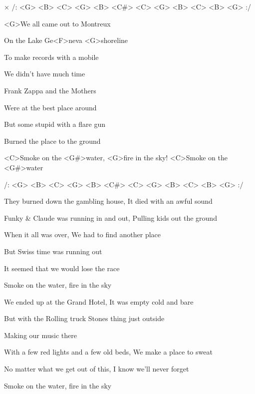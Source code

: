 

× /: <G> <B> <C> <G> <B> <C#> <C> <G> 
<B> <C> <B> <G> :/
\kr

\zs
<G>We all came out to Montreux

On the Lake Ge<F>neva <G>shoreline

To make records with a mobile

We didn't have much time

Frank Zappa and the Mothers

Were at the best place around

But some stupid with a flare gun

Burned the place to the ground
\ks

\zr
<C>Smoke on the <G#>water, <G>fire in the sky! <C>Smoke on the <G#>water

/: <G> <B> <C> <G> <B> <C#> <C> <G> <B> <C> <B> <G> :/
\kr

\zs
They burned down the gambling house,
It died with an awful sound

Funky \& Claude was running in and out,
Pulling kids out the ground

When it all was over,
We had to find another place

But Swiss time was running out

It seemed that we would lose the race

Smoke on the water, fire in the sky
\ks

\zs
We ended up at the Grand Hotel,
It was empty cold and bare

But with the Rolling truck Stones thing just outside

Making our music there

With a few red lights and a few old beds,
We make a place to sweat

No matter what we get out of this,
I know we'll never forget

Smoke on the water, fire in the sky
\ks

\kp
